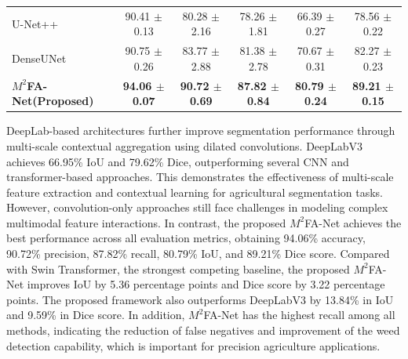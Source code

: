 \documentclass[pdflatex,sn-mathphys-num]{sn-jnl}
\begin{document}
\begin{table}[t]
{\begin{tabular}{lccccc}
U-Net++ \cite{zhou2018unet++}
& 90.41 $\pm$ 0.13 
& 80.28 $\pm$ 2.16 
& 78.26 $\pm$ 1.81 
& 66.39 $\pm$ 0.27 
& 78.56 $\pm$ 0.22 \\

DenseUNet \cite{mu2023densenet}
& 90.75 $\pm$ 0.26
& 83.77 $\pm$ 2.88 
& 81.38 $\pm$ 2.78 
& 70.67 $\pm$ 0.31 
& 82.27 $\pm$ 0.23 \\

\textbf{$M^2$FA-Net(Proposed)}
& \textbf{94.06 $\pm$ 0.07} 
& \textbf{90.72 $\pm$ 0.69}
& \textbf{87.82 $\pm$ 0.84} 
& \textbf{80.79 $\pm$ 0.24} 
& \textbf{89.21 $\pm$ 0.15} \\

\hline
\end{tabular}
}
\end{table}



DeepLab-based architectures further improve segmentation performance through multi-scale contextual aggregation using dilated convolutions. DeepLabV3 achieves 66.95\% IoU and 79.62\% Dice, outperforming several CNN and transformer-based approaches. This demonstrates the effectiveness of multi-scale feature extraction and contextual learning for agricultural segmentation tasks. However, convolution-only approaches still face challenges in modeling complex multimodal feature interactions. 
In contrast, the proposed $M^2$FA-Net achieves the best performance across all evaluation metrics, obtaining 94.06\% accuracy, 90.72\% precision, 87.82\% recall, 80.79\% IoU, and 89.21\% Dice score. Compared with Swin Transformer, the
strongest competing baseline, the proposed
$M^2$FA-Net improves IoU by 5.36 percentage
points and Dice score by 3.22 percentage
points. The proposed framework also outperforms DeepLabV3 by 13.84\% in IoU and 9.59\% in Dice score. In addition, $M^2$FA-Net has the highest recall among all methods, indicating the reduction of false negatives and improvement of the weed detection capability, which is important for precision agriculture applications.
\end{document}
